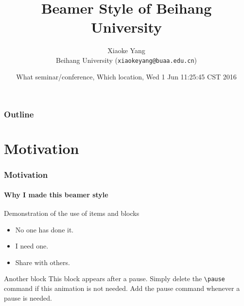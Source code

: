 \documentclass[10pt]{beamer}
\title{Beamer Style of Beihang University}
\author{Xiaoke Yang\\
Beihang University (\texttt{xiaokeyang@buaa.edu.cn})}
\date{What seminar/conference, Which location, Wed  1 Jun 11:25:45 CST 2016}
\begin{document}
\begin{frame}[plain]
\maketitle
\end{frame}

\begin{frame}
\frametitle{Outline}
\tableofcontents
\end{frame}
\section{Motivation}
\begin{frame}
\frametitle{Motivation}
\framesubtitle{Why I made this beamer style}
\begin{block}{Demonstration of the use of items and blocks}
\begin{itemize}
\item No one has done it.
\item I need one.
\pause \item Share with others.
\end{itemize}
\end{block}
\pause
\begin{block}{Another block}
This block appears after a pause. Simply delete the \texttt{\textbackslash pause} command if this animation is not needed. Add the pause command whenever a pause is needed. 
\end{block}
\end{frame}

\end{document}
